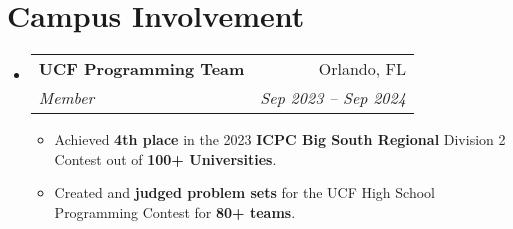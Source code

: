 \documentclass[letterpaper,11pt]{article}
\makeatletter
\newcommand{\resumeItem}[1]{
  \item\small{
    {#1 \vspace{-2pt}}
  }
}
\newcommand{\resumeSubheading}[4]{
  \vspace{-2pt}\item
    \begin{tabular*}{0.97\textwidth}[t]{l@{\extracolsep{\fill}}r}
      \textbf{#1} & #2 \\
      \textit{\small#3} & \textit{\small #4} \\
    \end{tabular*}\vspace{-7pt}
}
\newcommand{\resumeSubHeadingListStart}{\begin{itemize}[leftmargin=0.15in, label={}]}
\newcommand{\resumeSubHeadingListEnd}{\end{itemize}}
\newcommand{\resumeItemListStart}{\begin{itemize}}
\newcommand{\resumeItemListEnd}{\end{itemize}\vspace{-5pt}}
\makeatother
\begin{document}
\section{Campus Involvement}
  \resumeSubHeadingListStart
    \resumeSubheading
      {UCF Programming Team}{Orlando, FL}
      {Member}{Sep 2023 -- Sep 2024}
      \resumeItemListStart
        \resumeItem{Achieved \textbf{4th place} in the 2023 \textbf{ICPC Big South Regional} Division 2 Contest out of \textbf{100+ Universities}.}
        \resumeItem{Created and \textbf{judged problem sets} for the UCF High School Programming Contest for \textbf{80+ teams}.}
      \resumeItemListEnd
  \resumeSubHeadingListEnd
\end{document}
